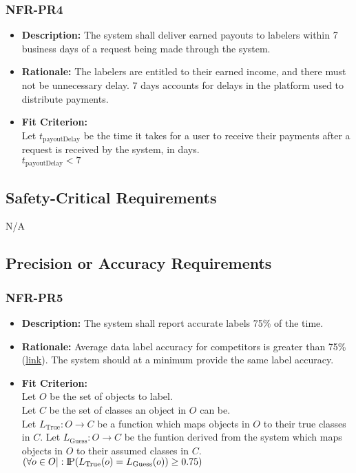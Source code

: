 \documentclass[12pt]{article}
\newcommand{\probP}{\text{I\kern-0.15em P}}
\begin{document}
\subsubsection*{NFR-PR4}
\begin{itemize}
  \item \textbf{Description:} The system shall deliver earned payouts to labelers within 7 business days of a request being made through the system.
  \item \textbf{Rationale:} The labelers are entitled to their earned income, and there must not be unnecessary delay. 7 days accounts for delays in the platform used to distribute payments.
  \item \textbf{Fit Criterion:}\\ Let $t_{\text{payoutDelay}}$ be the time it takes for a user to receive their payments after a request is received by the system, in days.\\
  $t_{\text{payoutDelay}} < 7$
\end{itemize}
\subsection{Safety-Critical Requirements}
N/A
\subsection{Precision or Accuracy Requirements}
\subsubsection*{NFR-PR5}
\begin{itemize}
  \item \textbf{Description:} The system shall report accurate labels 75\% of the time.
  \item \textbf{Rationale:} Average data label accuracy for competitors is greater than 75\% (\href{https://www.researchgate.net/publication/234774537_Data_quality_from_crowdsourcing_A_study_of_annotation_selection_criteria#:~:text=Depending%20on%20the%20number%20of,%5B13%5D%20%5B14%5D%20.}{link}). The system should at a minimum provide the same label accuracy.
  \item \textbf{Fit Criterion:}\\ Let $O$ be the set of objects to label.\\
  Let $C$ be the set of classes an object in $O$ can be.\\
  Let $L_{\text{True}}: O \rightarrow C $ be a function which maps objects in $O$ to their true classes in $C$.
  Let $L_{\text{Guess}}: O \rightarrow C $ be the funtion derived from the system which maps objects in $O$ to their assumed classes in $C$.
  $(\forall o \in O|: \probP(L_{\text{True}}(o) = L_{\text{Guess}}(o))\geq 0.75)$
\end{itemize}
\end{document}
